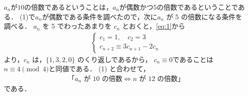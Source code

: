 \documentclass[../../main.tex]{subfiles}
\begin{document}
$a_n$が$10$の倍数であるということは，$a_n$が偶数かつ$5$の倍数であるということである．
(1)で$a_n$が偶数である条件を調べたので，次に$a_n$ が 5 の倍数になる条件を調べる．
$a_n$ を 5 でわったあまりを $c_n$ とおくと，\cref{eq:1}から
\begin{align}
  \begin{cases}
    c_1 = 1, \quad c_2 = 3 \\
    c_{n+2} \equiv 3c_{n+1} - 2c_n
  \end{cases} \label{eq:3}
\end{align}
より，$c_n$ は，$\{1, 3, 2, 0\}$ のくり返しであるから，
$c_n \equiv 0$であることは$n \equiv 4 \pmod 4$と同値である．
(1) と合わせて，
\begin{align}
  \text{「} a_n \text{ が 10 の倍数} \iff n \text{ が 12 の倍数} \text{」}
\end{align}
である．

\newpage
\end{document}
